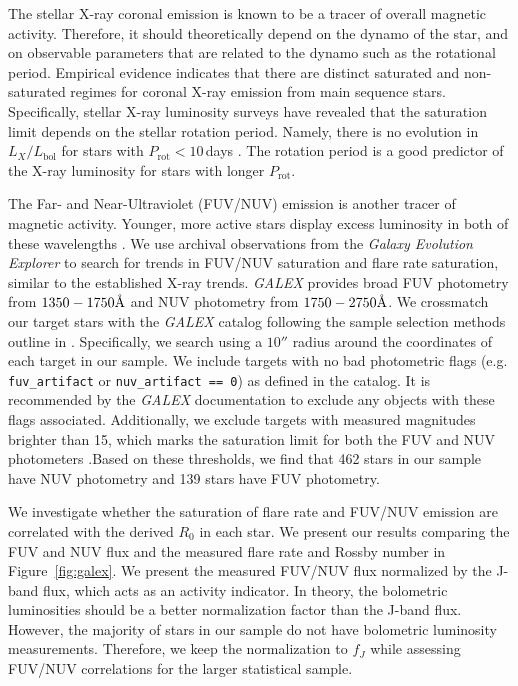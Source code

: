 \documentclass[twocolumn]{aastex631}
\newcommand{\angstrom}{\mbox{\normalfont\AA}}
\begin{document}
The stellar X-ray coronal emission is known to be a tracer of overall magnetic activity. Therefore,  it should theoretically depend on the dynamo of the star, and on observable parameters that
are related to the dynamo such as the rotational period. Empirical evidence indicates that there are distinct saturated and non-saturated regimes for coronal X-ray emission from main sequence
stars. Specifically, stellar X-ray luminosity surveys have revealed that the saturation limit depends on the stellar rotation period. Namely, there is no evolution in $L_X/L_\textrm{bol}$ for
stars with $P_\textrm{rot} < 10$\,days \citep{Pizzolato03}. The rotation period is a good predictor of the X-ray luminosity for stars with longer $P_\textrm{rot}$.

The Far- and Near-Ultraviolet (FUV/NUV) emission is another tracer of magnetic activity. Younger, more active stars display excess luminosity in both of these wavelengths \citep{Shkolnik2013}.
We use archival observations from the \textit{Galaxy Evolution Explorer} \citep[\textit{GALEX};][]{martin05} to search for trends in FUV/NUV saturation and flare rate saturation, similar to the
established X-ray trends. \textit{GALEX} provides broad FUV photometry from $1350-1750 \angstrom$ and NUV photometry from $1750-2750 \angstrom$. We crossmatch our target stars with the
\textit{GALEX} catalog following the sample selection methods outline in \citep{schneider18}. Specifically, we search using a $10''$ radius around the coordinates of each target in our sample.
We include targets with no bad photometric flags (e.g. \texttt{fuv\_artifact} or \texttt{nuv\_artifact == 0}) as defined
in the catalog. It is recommended by the \textit{GALEX} documentation to exclude any objects with these flags associated. Additionally, we exclude targets with measured magnitudes brighter than
15, which marks the saturation limit for both the FUV and NUV photometers \citep{morrissey07}.Based on these thresholds, we find that 462 stars in our sample have NUV photometry and 139 stars have
FUV photometry.

We investigate whether the saturation of flare rate and FUV/NUV emission are correlated with the derived $R_0$ in each star. We present our results comparing the FUV and NUV flux and the measured
flare rate and Rossby number in Figure~\ref{fig:galex}. We present the measured FUV/NUV flux normalized by the J-band flux, which acts as an activity indicator. In theory, the bolometric luminosities
should be a better normalization factor than the J-band flux. However, the majority of stars in our sample do not have bolometric luminosity  measurements. Therefore, we keep the normalization to
$f_J$ while assessing FUV/NUV correlations for the larger statistical sample.
\end{document}
